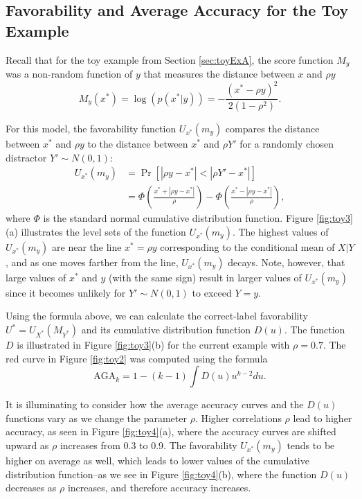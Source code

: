 \documentclass[twoside,11pt]{article}
\begin{document}
\subsection{Favorability and Average Accuracy for the Toy Example}

Recall that for the toy example from Section \ref{sec:toyExA}, the
score function $M_{y}$ was a non-random function of $y$ that measures
the distance between $x$ and $\rho y$
\[
M_{y}(x^*) = \log(p(x^*|y)) = -\frac{(x^* - \rho y)^2}{2(1-\rho^2)} .
\]

For this model, the favorability function $U_{x^*}(m_y)$ compares the
distance between $x^*$ and $\rho y$ to the distance between $x^*$ and
$\rho Y'$ for a randomly chosen distractor $ Y'\sim N(0,1)$:
\begin{align*}
U_{x^*}(m_y) &= \Pr[|\rho y - x^*|< |\rho Y' - x^*|]
\\&= \Phi\left(\frac{x^* + |\rho y - x^*|}{\rho}\right) - \Phi\left(\frac{x^* - |\rho y - x^*|}{\rho}\right),
\end{align*}
where $\Phi$ is the standard normal cumulative distribution function.
Figure \ref{fig:toy3}(a) illustrates the level sets of the function
$U_{x^*}(m_y)$.  The highest values of $U_{x^*}(m_y)$ are near the
line $x^* = \rho y$ corresponding to the conditional mean of $X|Y$, and as
one moves farther from the line, $U_{x^*}(m_y)$ decays.  Note, however,
that large values of $x^*$ and $y$ (with the same sign) result in
larger values of $U_{x^*}(m_y)$ since it becomes unlikely for $Y' \sim
N(0,1)$ to exceed $Y = y$.

Using the formula above, we can calculate the correct-label
favorability $U^* = U_{X^*}(M_{Y^*})$ and its cumulative distribution
function ${D}(u)$.  The function ${D}$ is illustrated in Figure
\ref{fig:toy3}(b) for the current example with $\rho = 0.7$.  The red
curve in Figure \ref{fig:toy2} was computed using the formula
\[
\text{AGA}_k = 1-(k-1) \int {D}(u) u^{k-2} du.
\]

It is illuminating to consider how the average accuracy curves and the
${D}(u)$ functions vary as we change the parameter $\rho$.  Higher
correlations $\rho$ lead to higher accuracy, as seen in Figure
\ref{fig:toy4}(a), where the accuracy curves are shifted upward as
$\rho$ increases from 0.3 to 0.9.  The favorability $U_{x^*}(m_y)$
tends to be higher on average as well, which leads to lower values of
the cumulative distribution function--as we see in Figure
\ref{fig:toy4}(b), where the function ${D}(u)$ decreases as
$\rho$ increases, and therefore accuracy increases.
\end{document}
